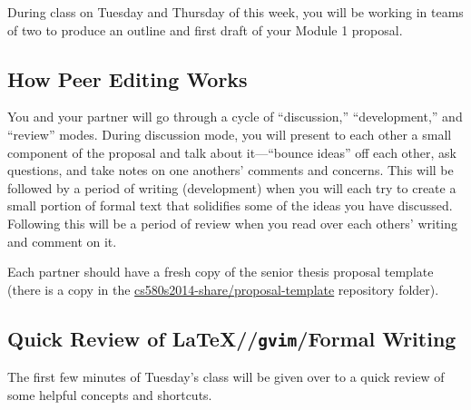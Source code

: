 
\usepackage[compact]{titlesec}




During class on Tuesday and Thursday of this week, you will be working
in teams of two to produce an outline and first draft of your Module 1 proposal.

\subsection*{How Peer Editing Works}
You and your partner will go through a cycle of ``discussion,''
``development,'' and ``review''  modes. 
During discussion mode, you will present to each other
a small component of the proposal and talk about it---``bounce ideas'' off
each other, ask questions, and take notes on one anothers' comments and concerns. 
This will be followed by
a period of writing (development) when you will each try to create a small
portion of formal text that solidifies some of the ideas you have discussed.
Following this will be a period of review when you read over each others'
writing and comment on it.

Each partner should have a fresh copy of the senior thesis proposal template
(there is a copy in the \url{cs580s2014-share/proposal-template} repository
folder).

\subsection*{Quick Review of \LaTeX/\BibTeX/{\tt gvim}/Formal Writing}
The first few minutes of Tuesday's class will be given over to a quick review
of some helpful concepts and shortcuts.


